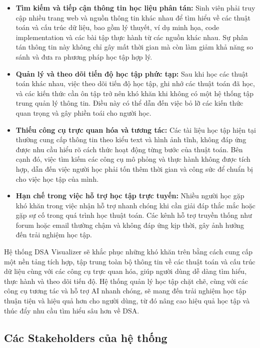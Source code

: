 \begin{itemize}
\item \textbf{Tìm kiếm và tiếp cận thông tin học liệu phân tán:} Sinh viên phải truy cập nhiều trang web và nguồn thông tin khác nhau để tìm hiểu về các thuật toán và cấu trúc dữ liệu, bao gồm lý thuyết, ví dụ minh họa, code implementation và các bài tập thực hành từ các nguồn khác nhau. Sự phân tán thông tin này không chỉ gây mất thời gian mà còn làm giảm khả năng so sánh và đưa ra phương pháp học tập hợp lý.

\item \textbf{Quản lý và theo dõi tiến độ học tập phức tạp:} Sau khi học các thuật toán khác nhau, việc theo dõi tiến độ học tập, ghi nhớ các thuật toán đã học, và các kiến thức cần ôn tập trở nên khó khăn khi không có một hệ thống tập trung quản lý thông tin. Điều này có thể dẫn đến việc bỏ lỡ các kiến thức quan trọng và gây phiền toái cho người học.

\item \textbf{Thiếu công cụ trực quan hóa và tương tác:} Các tài liệu học tập hiện tại thường cung cấp thông tin theo kiểu text và hình ảnh tĩnh, không đáp ứng được nhu cầu hiểu rõ cách thức hoạt động từng bước của thuật toán. Bên cạnh đó, việc tìm kiếm các công cụ mô phỏng và thực hành không được tích hợp, dẫn đến việc người học phải tốn thêm thời gian và công sức để chuẩn bị cho việc học tập của mình.

\item \textbf{Hạn chế trong việc hỗ trợ học tập trực tuyến:} Nhiều người học gặp khó khăn trong việc nhận hỗ trợ nhanh chóng khi cần giải đáp thắc mắc hoặc gặp sự cố trong quá trình học thuật toán. Các kênh hỗ trợ truyền thống như forum hoặc email thường chậm và không đáp ứng kịp thời, gây ảnh hưởng đến trải nghiệm học tập.
\end{itemize}

Hệ thống DSA Visualizer sẽ khắc phục những khó khăn trên bằng cách cung cấp một nền tảng tích hợp, tập trung toàn bộ thông tin về các thuật toán và cấu trúc dữ liệu cùng với các công cụ trực quan hóa, giúp người dùng dễ dàng tìm hiểu, thực hành và theo dõi tiến độ. Hệ thống quản lý học tập chặt chẽ, cùng với các công cụ tương tác và hỗ trợ AI nhanh chóng, sẽ mang đến trải nghiệm học tập thuận tiện và hiệu quả hơn cho người dùng, từ đó nâng cao hiệu quả học tập và thúc đẩy nhu cầu tìm hiểu sâu hơn về DSA.

\subsection{Các Stakeholders của hệ thống}
\label{subsec:stakeholders}

